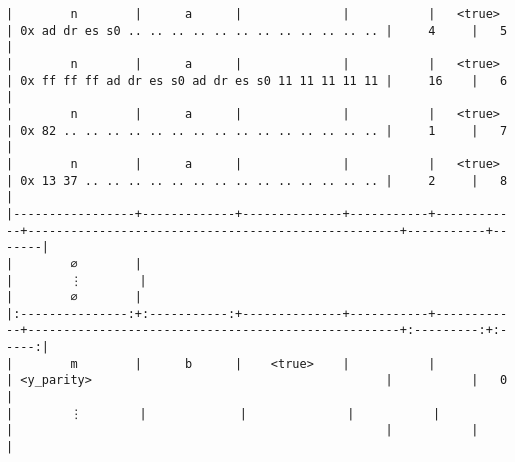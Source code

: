 \documentclass[varwidth=\maxdimen,margin=0.5cm,multi={verbatim}]{standalone}
\begin{document}
\begin{verbatim}
|        n        |      a      |              |           |   <true>   | 0x ad dr es s0 .. .. .. .. .. .. .. .. .. .. .. .. |     4     |   5   |
|        n        |      a      |              |           |   <true>   | 0x ff ff ff ad dr es s0 ad dr es s0 11 11 11 11 11 |     16    |   6   |
|        n        |      a      |              |           |   <true>   | 0x 82 .. .. .. .. .. .. .. .. .. .. .. .. .. .. .. |     1     |   7   |
|        n        |      a      |              |           |   <true>   | 0x 13 37 .. .. .. .. .. .. .. .. .. .. .. .. .. .. |     2     |   8   |
|-----------------+-------------+--------------+-----------+------------+----------------------------------------------------+-----------+-------|
|        ∅        |
|        ⋮        |
|        ∅        |
|:---------------:+:-----------:+--------------+-----------+------------+----------------------------------------------------+:---------:+:-----:|
|        m        |      b      |    <true>    |           |            | <y_parity>                                         |           |   0   |
|        ⋮        |             |              |           |            |                                                    |           |       |

\end{verbatim}
\end{document}
